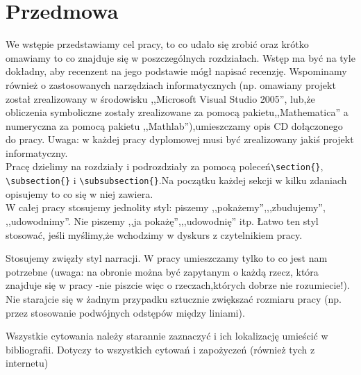 \chapter{Przedmowa}
We wstępie przedstawiamy cel pracy, to co udało się zrobić oraz krótko omawiamy to co znajduje się w poszczególnych rozdziałach. Wstęp ma być na tyle dokładny, aby recenzent na jego podstawie mógł napisać recenzję. Wspominamy również o zastosowanych narzędziach informatycznych (np. omawiany projekt został
zrealizowany w środowisku ,,Microsoft Visual Studio 2005'', lub,że obliczenia symboliczne zostały zrealizowane za pomocą pakietu,,Mathematica'' a numeryczna za pomocą pakietu ,,Mathlab''),umieszczamy opis CD dołączonego do pracy. Uwaga: w każdej pracy dyplomowej musi być zrealizowany jakiś projekt informatyczny. \\

Pracę dzielimy na rozdziały i podrozdziały za pomocą poleceń\verb"\section{}", \verb"\subsection{}" i \verb"\subsubsection{}".Na początku każdej sekcji w kilku zdaniach opisujemy to co się w niej zawiera.\\

W całej pracy stosujemy jednolity styl: piszemy ,,pokażemy'',,,zbudujemy'', ,,udowodnimy''. Nie piszemy ,,ja pokażę'',,,udowodnię'' itp. Łatwo ten styl stosować, jeśli myślimy,że wchodzimy w dyskurs z czytelnikiem pracy.
 
Stosujemy zwięzły styl narracji. W pracy umieszczamy tylko to co jest nam potrzebne (uwaga: na obronie można być zapytanym o każdą rzecz, która znajduje się w pracy -nie piszcie więc o rzeczach,których dobrze nie rozumiecie!). Nie starajcie się w żadnym przypadku sztucznie zwiększać rozmiaru pracy (np. przez stosowanie podwójnych odstępów między liniami). 

Wszystkie cytowania należy starannie zaznaczyć i ich lokalizację umieścić w bibliografii. Dotyczy to wszystkich cytowań i zapożyczeń (również tych z internetu)